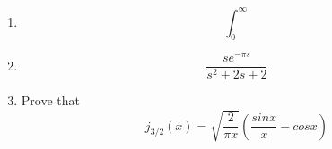 \documentclass[17pt]{extarticle}
\begin{document}
\begin{enumerate}
    \item $$ \int_0^{\infty} $$
    \item $$\frac{se^{-\pi s}}{s^2+2s+2}$$
    \item Prove that $$j_{3/2}(x) = \sqrt{\frac{2}{\pi x}} \left( \frac{sin x}{x} - cos x\right) $$
\end{enumerate}
\end{document}
